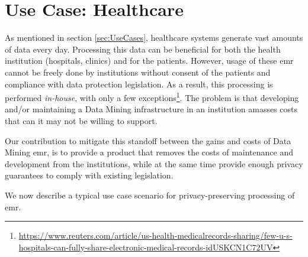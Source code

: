 
\section{Use Case: Healthcare}
\label{}


As mentioned in section \ref{sec:UseCases}, healthcare systems generate vast amounts of data every day. Processing this data can be beneficial for both the health institution (hospitals, clinics) and for the patients. However, usage of these \ac{emr} cannot be freely done by institutions without consent of the patients and compliance with data protection legislation. As a result, this processing is performed \textit{in-house}, with only a few exceptions\footnote{\url{https://www.reuters.com/article/us-health-medicalrecords-sharing/few-u-s-hospitals-can-fully-share-electronic-medical-records-idUSKCN1C72UV}}. The problem is that developing and/or maintaining a Data Mining infrastructure in an institution amasses costs that can it may not be willing to support.

Our contribution to mitigate this standoff between the gains and costs of Data Mining \ac{emr}, is to provide a product that removes the costs of maintenance and development from the institutions, while at the same time provide enough privacy guarantees to comply with existing legislation.


We now describe a typical use case scenario for privacy-preserving processing of \ac{emr}.

